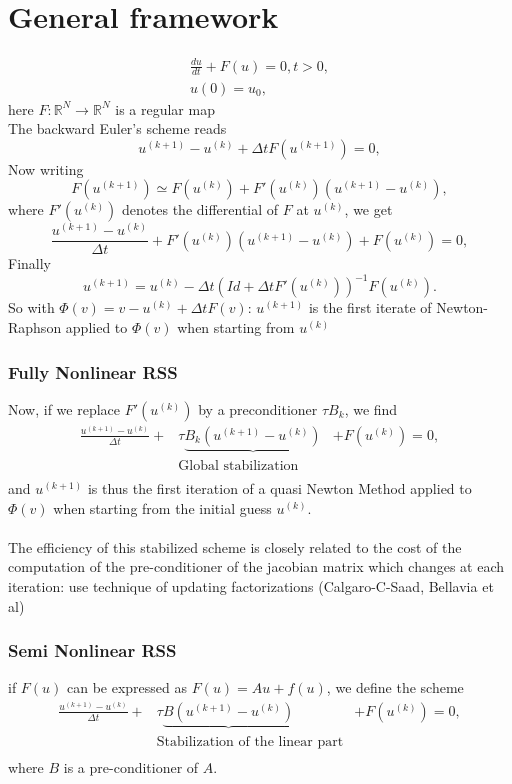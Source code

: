 \documentclass[hyperref={pdfpagemode=FullScreen},9pt]{beamer}
\newcommand\R{\mathbb{R}}
\newcommand{\Frac}[2] {\frac{\textstyle #1} {\textstyle #2}}
\begin{document}
\section{General framework}
\begin{frame}
\begin{eqnarray}
\Frac{du}{dt}+F(u)=0, t>0,\\
u(0)=u_0,
\end{eqnarray}
here $F : \R^N\rightarrow \R^N$ is a regular map\\
The backward Euler's scheme reads
$$
u^{(k+1)}-u^{(k)}+\Delta tF(u^{(k+1)})=0,
$$
Now writing 
$$
F(u^{(k+1)})\simeq F(u^{(k)}) +F'(u^{(k)})(u^{(k+1)}-u^{(k)}),
$$
where $F'(u^{(k)})$ denotes the differential of $F$ at $u^{(k)}$, we get
$$
\Frac{u^{(k+1)}-u^{(k)}}{\Delta t} + F'(u^{(k)})(u^{(k+1)}-u^{(k)})
+F(u^{(k)})=0,
$$
Finally
$$
u^{(k+1)}=u^{(k)}-\Delta t(Id +\Delta tF'(u^{(k)}))^{-1}F(u^{(k)}).
$$
\pause
So with  $\Phi(v)=v-u^{(k)}+\Delta tF(v)$:  $u^{(k+1)}$ is the first iterate of Newton-Raphson applied to
$\Phi(v)$ when starting from  $u^{(k)}$
\end{frame}
%
\begin{frame}
\frametitle{Fully Nonlinear RSS}
Now, if we replace  $F'(u^{(k)})$ by a preconditioner $\tau B_k$, we
find
\begin{equation}
\begin{array}{lll}
\Frac{u^{(k+1)}-u^{(k)}}{\Delta t}+&\tau
\underbrace{B_k(u^{(k+1)}-u^{(k)})}&+F(u^{(k)})=0,\\
&\mbox{Global stabilization}& \\
\end{array}
\label{NLRSS1}
\end{equation}
and $u^{(k+1)}$ is thus the first iteration of a quasi Newton Method
applied to $\Phi(v)$ when starting from the initial guess $u^{(k)}$.\\
\\
\pause
The efficiency of this stabilized scheme is closely related to the
cost of the computation of the pre-conditioner of the jacobian matrix which
changes at each iteration: use technique of updating 
factorizations (Calgaro-C-Saad, Bellavia et al) 
\end{frame}
%
\begin{frame}
\frametitle{Semi Nonlinear RSS}
if $F(u)$ can be expressed as $F(u)=Au+f(u)$, we define the scheme
\begin{equation}
\begin{array}{lll}
\Frac{u^{(k+1)}-u^{(k)}}{\Delta t}+&\tau
\underbrace{B(u^{(k+1)}-u^{(k)})}&+F(u^{(k)})=0,\\
&\mbox{Stabilization of the linear part}&\\
\end{array}
\label{NLRSS}
\end{equation}
where $B$ is a pre-conditioner of $A$.
\end{frame}
\end{document}
